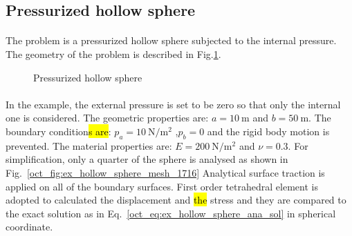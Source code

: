 \subsection{Pressurized hollow sphere}
\paragraph{}
The problem is a pressurized hollow sphere subjected to the internal pressure.
The geometry of the problem is described in Fig.\ref{oct_fig:ex_pre-hollow-sphere}. 

\begin{figure}[h!]
  \centering
  \caption{Pressurized hollow sphere}
  \label{oct_fig:ex_pre-hollow-sphere}
\end{figure}

\paragraph{}
In the example, the external pressure is set to be zero so that only the internal one is considered.
The geometric properties are: $a=\SI{10}{\meter}$ and $b=\SI{50}{\meter}$.
The boundary condition\hl{s are}: $p_a = \SI{10}{\newton \per \square \meter}$ ,$p_b = 0$ and the rigid body motion is prevented.
The material properties are: $E=\SI{200}{\newton \per \square \meter}$ and $\nu=0.3$.
For simplification, only a quarter of the sphere is analysed as shown in Fig.~\ref{oct_fig:ex_hollow_sphere_mesh_1716}
Analytical surface traction is applied on all of the boundary surfaces.
First order tetrahedral element is adopted to calculated the displacement and \hl{the} stress and they are compared to the exact solution as in Eq.~\ref{oct_eq:ex_hollow_sphere_ana_sol} in spherical coordinate.

